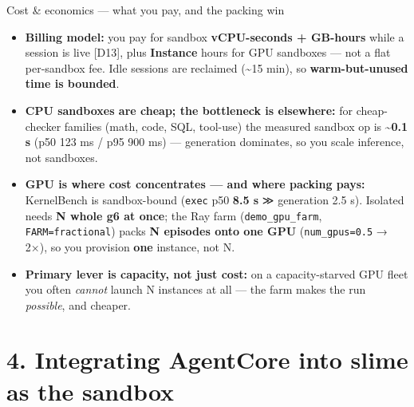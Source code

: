 \documentclass[
  10pt,
  ignorenonframetext,
  aspectratio=169,
  t]{beamer}
\providecommand{\tightlist}{%
  \setlength{\itemsep}{0pt}\setlength{\parskip}{0pt}}
\begin{document}
\begin{frame}{Cost \& economics --- what you pay, and the
packing win}
\protect\hypertarget{cost-economics-what-you-pay-and-the-packing-win}{}
\begin{itemize}
\tightlist
\item
  \textbf{Billing model:} you pay for sandbox \textbf{vCPU-seconds +
  GB-hours} while a session is live {[}D13{]}, plus \textbf{Instance}
  hours for GPU sandboxes --- not a flat per-sandbox fee. Idle sessions
  are reclaimed (\textasciitilde15 min), so \textbf{warm-but-unused time
  is bounded}.
\item
  \textbf{CPU sandboxes are cheap; the bottleneck is elsewhere:} for
  cheap-checker families (math, code, SQL, tool-use) the measured
  sandbox op is \textbf{\textasciitilde0.1 s} (p50 123 ms / p95 900 ms)
  --- generation dominates, so you scale inference, not sandboxes.
\item
  \textbf{GPU is where cost concentrates --- and where packing pays:}
  KernelBench is sandbox-bound (\texttt{exec} p50 \textbf{8.5 s} ≫
  generation 2.5 s). Isolated needs \textbf{N whole g6 at once}; the Ray
  farm (\texttt{demo\_gpu\_farm}, \texttt{FARM=fractional}) packs
  \textbf{N episodes onto one GPU} (\texttt{num\_gpus=0.5} → 2×), so you
  provision \textbf{one} instance, not N.
\item
  \textbf{Primary lever is capacity, not just cost:} on a
  capacity-starved GPU fleet you often \emph{cannot} launch N instances
  at all --- the farm makes the run \emph{possible}, and cheaper.
\end{itemize}
\end{frame}

\hypertarget{integrating-agentcore-into-slime-as-the-sandbox}{%
\section{4. Integrating AgentCore into slime as the
sandbox}\label{integrating-agentcore-into-slime-as-the-sandbox}}
\end{document}
